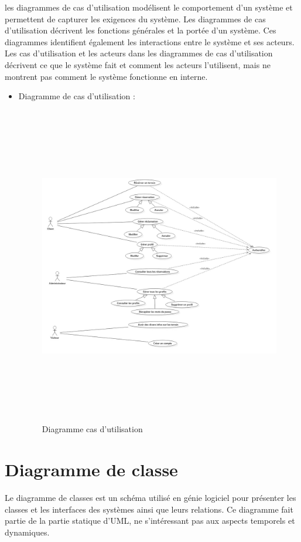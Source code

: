 \documentclass[a4paper]{report}
\begin{document}
\begin{spacing}{2}
les diagrammes de cas d'utilisation modélisent le comportement d'un système et permettent de capturer les exigences du système. Les diagrammes de cas d'utilisation décrivent
les fonctions générales et la portée d'un système. Ces diagrammes identifient également les
interactions entre le système et ses acteurs. Les cas d'utilisation et les acteurs dans les diagrammes de cas d'utilisation décrivent ce que le système fait et comment les acteurs l'utilisent,
mais ne montrent pas comment le système fonctionne en interne.
\cleardoublepage
\begin{itemize}
\item Diagramme de cas d’utilisation :
\begin{figure}[!ht]
\begin{center}
\includegraphics[height=14cm]{image/Cas_Utilisation.jpg}
\end{center}
\caption[Diagramme cas d'utilisation]{Diagramme cas d'utilisation}
\end{figure}

\cleardoublepage
 
\end{itemize}

\section{Diagramme de classe}
Le diagramme de classes est un schéma utilisé en génie logiciel pour présenter les classes et les interfaces des systèmes ainsi que leurs relations. Ce diagramme fait partie de la partie statique d'UML, ne s'intéressant pas aux aspects temporels et dynamiques.


\end{spacing}
\end{document}
